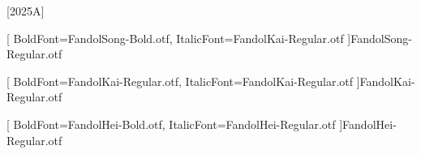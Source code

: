 [2025A]


\setsansfont{TeX Gyre Heros} %




[
    BoldFont=FandolSong-Bold.otf,
    ItalicFont=FandolKai-Regular.otf
    ]{FandolSong-Regular.otf}

[
    BoldFont=FandolKai-Regular.otf,
    ItalicFont=FandolKai-Regular.otf
]{FandolKai-Regular.otf}

[
    BoldFont=FandolHei-Bold.otf,
    ItalicFont=FandolHei-Regular.otf
]{FandolHei-Regular.otf}



\newcommand\kaishu{\CJKfamily{kai}} %
\newcommand\songti{\CJKfamily{song}}
\newcommand\heiti{\CJKfamily{hei}}
\newcommand\notoheiti{\CJKfamily{hei2}}
